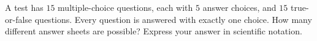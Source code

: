 A test has $15$ multiple-choice questions, each with $5$ answer choices, and $15$ true-or-false questions. Every question is answered with exactly one choice. How many different answer sheets are possible? Express your answer in scientific notation.
